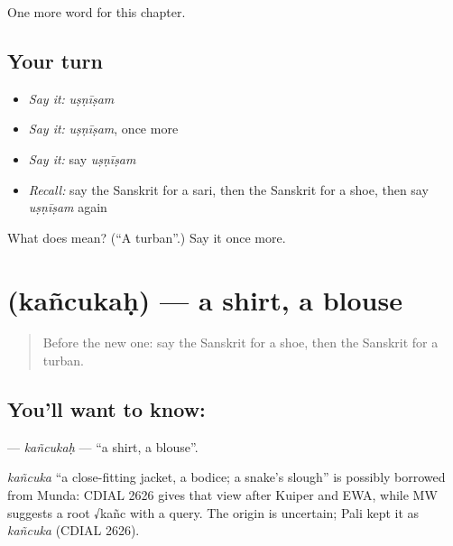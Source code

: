 \begin{grammarlens}[title={What you've built}]
One more word for this chapter.
\end{grammarlens}

\subsection*{Your turn}
\begin{itemize}
\raggedright
  \item \emph{Say it:} \emph{uṣṇīṣam}
  \item \emph{Say it:} \emph{uṣṇīṣam}, once more
  \item \emph{Say it:} say \emph{uṣṇīṣam}
  \item \emph{Recall:} say the Sanskrit for a sari, then the Sanskrit for a shoe, then say \emph{uṣṇīṣam} again
\end{itemize}

\begin{tcolorbox}[breakable,colback=teal!4,colframe=teal!35!black,title={Before you move on}]
What does  mean? (\textquotedblleft{}A turban\textquotedblright{}.) Say it once more.
\end{tcolorbox}
\section[\texorpdfstring{\sk{कञ्चुकः} (kañcukaḥ)}{कञ्चुकः (kañcukaḥ)}]{ (kañcukaḥ) — a shirt, a blouse}

\label{lesson:SA-C104-kancukah}



\begin{quote}
Before the new one: say the Sanskrit for a shoe, then the Sanskrit for a turban.
\end{quote}

\subsection*{You'll want to know: }
\textbf{} — \emph{kañcukaḥ} — \textquotedblleft{}a shirt, a blouse\textquotedblright{}.

\begin{cousinweb}
\emph{kañcuka} \textquotedblleft{}a close-fitting jacket, a bodice; a snake's slough\textquotedblright{} is possibly borrowed from Munda: CDIAL 2626 gives that view after Kuiper and EWA, while MW suggests a root √kañc with a query. The origin is uncertain; Pali kept it as \emph{kañcuka} (CDIAL 2626).
\end{cousinweb}


